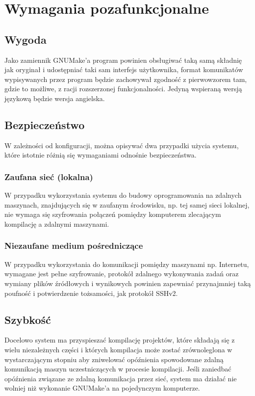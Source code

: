 \documentclass[a4paper]{article}
\begin{document}
\section{Wymagania pozafunkcjonalne}

\subsection{Wygoda}

Jako zamiennik GNUMake’a program powinien obsługiwać taką samą składnię jak oryginał i udostępniać taki sam interfejs użytkownika, format komunikatów wypisywanych przez program będzie zachowywał zgodność z pierwowzorem tam, gdzie to możliwe, z racji rozszerzonej funkcjonalności.
Jedyną wspieraną wersją językową będzie wersja angielska.


\subsection{Bezpieczeństwo}

W zależności od konfiguracji, można opisywać dwa przypadki użycia systemu, które istotnie różnią się wymaganiami odnośnie bezpieczeństwa.

\subsubsection{Zaufana sieć (lokalna)}

W przypadku wykorzystania systemu do budowy oprogramowania na zdalnych maszynach, znajdujących się w zaufanym środowisku, np. tej samej sieci lokalnej, nie wymaga się szyfrowania połączeń pomiędzy komputerem zlecającym kompilację a zdalnymi maszynami.

\subsubsection{Niezaufane medium pośredniczące}

W przypadku wykorzystania do komunikacji pomiędzy maszynami np. Internetu, wymagane jest pełne szyfrowanie, protokół zdalnego wykonywania zadań oraz wymiany plików źródłowych i wynikowych powinien zapewniać przynajmniej taką poufność i potwierdzenie tożsamości, jak protokół SSHv2.


\subsection{Szybkość}

Docelowo system ma przyspieszać kompilację projektów, które składają się z wielu niezależnych części i których kompilacja może zostać zrównoleglona w wystarczającym stopniu aby zniwelować opóźnienia spowodowane zdalną komunikacją maszyn uczestniczących w procesie kompilacji.
Jeśli zaniedbać opóźnienia związane ze zdalną komunikacja przez sieć, system ma działać nie wolniej niż wykonanie GNUMake’a na pojedynczym komputerze.
\end{document}
